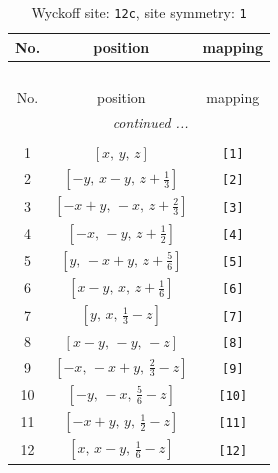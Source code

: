 \documentclass[fleqn,8pt]{jsarticle}
\begin{document}
\begin{longtable}{ccc}
\caption{Wyckoff site: {\tt 12c}, site symmetry: {\tt 1}}
 \\
 \hline \hline
No. & position & mapping \\ \hline \endfirsthead

\multicolumn{2}{l}{\tablename\ \thetable{}} \\
 \hline \hline
No. & position & mapping \\ \hline \endhead

 \hline \hline
\multicolumn{2}{r}{\footnotesize\it continued ...} \\ \endfoot

 \hline \hline
\multicolumn{2}{r}{} \\ \endlastfoot

1 & $\left[ x,\, y,\, z \right]$ & {\tt [1]} \\ \hline
2 & $\left[ - y,\, x - y,\, z + \frac{1}{3} \right]$ & {\tt [2]} \\ \hline
3 & $\left[ - x + y,\, - x,\, z + \frac{2}{3} \right]$ & {\tt [3]} \\ \hline
4 & $\left[ - x,\, - y,\, z + \frac{1}{2} \right]$ & {\tt [4]} \\ \hline
5 & $\left[ y,\, - x + y,\, z + \frac{5}{6} \right]$ & {\tt [5]} \\ \hline
6 & $\left[ x - y,\, x,\, z + \frac{1}{6} \right]$ & {\tt [6]} \\ \hline
7 & $\left[ y,\, x,\, \frac{1}{3} - z \right]$ & {\tt [7]} \\ \hline
8 & $\left[ x - y,\, - y,\, - z \right]$ & {\tt [8]} \\ \hline
9 & $\left[ - x,\, - x + y,\, \frac{2}{3} - z \right]$ & {\tt [9]} \\ \hline
10 & $\left[ - y,\, - x,\, \frac{5}{6} - z \right]$ & {\tt [10]} \\ \hline
11 & $\left[ - x + y,\, y,\, \frac{1}{2} - z \right]$ & {\tt [11]} \\ \hline
12 & $\left[ x,\, x - y,\, \frac{1}{6} - z \right]$ & {\tt [12]} \\
\end{longtable}
\end{document}

